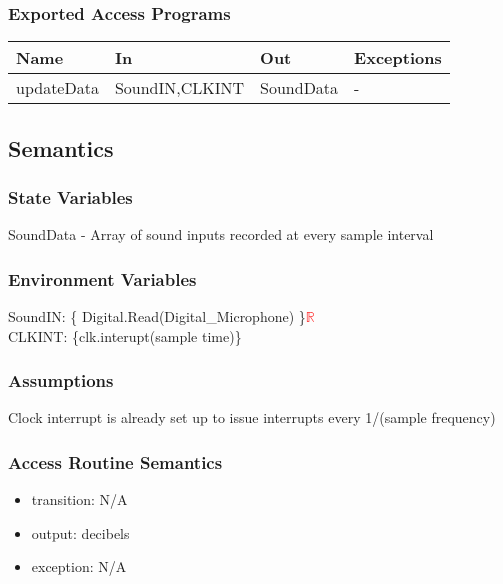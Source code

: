 \documentclass[12pt, titlepage]{article}
\begin{document}
\subsubsection{Exported Access Programs}

\begin{center}
\begin{tabular}{p{2cm} p{4cm} p{4cm} p{2cm}}
\hline
\textbf{Name} & \textbf{In} & \textbf{Out} & \textbf{Exceptions} \\
\hline
updateData & SoundIN,CLKINT & SoundData & - \\
\hline
\end{tabular}
\end{center}

\subsection{Semantics}

\subsubsection{State Variables}

SoundData - Array of sound inputs recorded at every sample interval

\subsubsection{Environment Variables}

SoundIN: \{ Digital.Read(Digital\_Microphone) \}\textcolor{red}{$\mathbb{R}$}\\
CLKINT: \{clk.interupt(sample time)\}

\subsubsection{Assumptions}

Clock interrupt is already set up to issue interrupts every 1/(sample frequency) 

\subsubsection{Access Routine Semantics}

\begin{itemize}
\item transition: N/A 
\item output: decibels
\item exception: N/A
\end{itemize}
\end{document}
